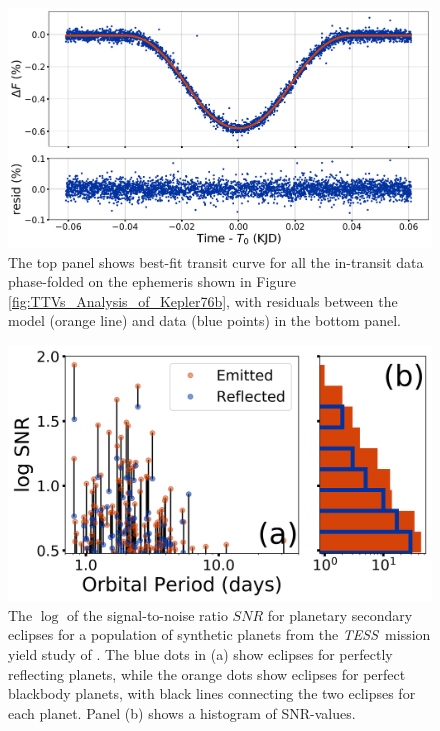\documentclass[manuscript]{aastex62}
\newcommand{\tess}{{\it TESS}}
\begin{document}
\begin{figure}
    \includegraphics[width=\textwidth]{final_best_fit_transit_Analysis_of_Kepler76b.png}
    \caption{The top panel shows best-fit transit curve for all the in-transit data phase-folded on the ephemeris shown in Figure \ref{fig:TTVs_Analysis_of_Kepler76b}, with residuals between the model (orange line) and data (blue points) in the bottom panel.}
    \label{fig:final_best_fit_transit_Analysis_of_Kepler76b}
\end{figure}

\begin{figure}
\includegraphics[width=\textwidth]{eclipse_estimates.jpg}
\caption{The $\log$ of the signal-to-noise ratio $SNR$ for planetary secondary eclipses for a population of synthetic planets from the \tess\ mission yield study of \citet{2018arXiv180405050B}. The blue dots in (a)  show eclipses for perfectly reflecting planets, while the orange dots show eclipses for perfect blackbody planets, with black lines connecting the two eclipses for each planet. Panel (b) shows a histogram of SNR-values. \label{fig:eclipse_estimates}}

\end{figure}
\end{document}
